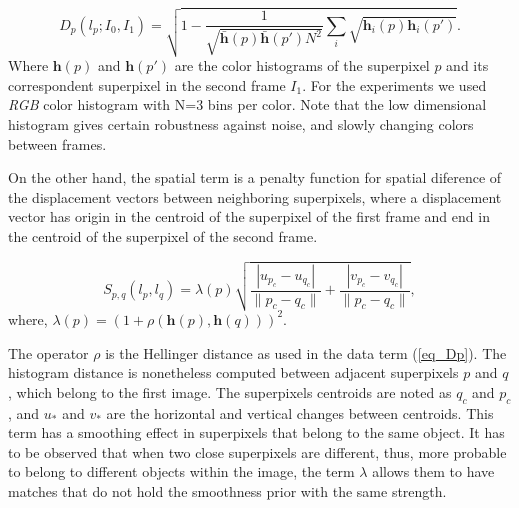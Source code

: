 \begin{equation}
D_p(l_p;I_0,I_1) = \sqrt{ 1 - \frac{1}{\sqrt{\bar{ \boldsymbol{h} }(p) \bar{ \boldsymbol{h} }(p')N^2} } \sum_{i}\sqrt{ \boldsymbol{h}_{i}(p) \boldsymbol{h}_{i}(p')} }.
\label{eq_Dp}
\end{equation}
Where $\textbf{h}(p)$ and $\textbf{h}(p')$ are the color histograms of the superpixel $p$ and its correspondent superpixel in the
second frame $I_1$. For the experiments we used {\it RGB} color histogram with N=3 bins per color.
Note that the low dimensional histogram gives certain robustness against noise,
and slowly changing colors between frames. 

On the other hand, the spatial term is a penalty function for spatial diference of the displacement vectors between neighboring superpixels, where a displacement vector has origin 
in the centroid of the superpixel of the first frame and
end in the centroid of the superpixel of the second frame.

\begin{equation}
S_{p,q}(l_p, l_q) = \lambda(p)
  \sqrt{\frac{|u_{p_c}-u_{q_c}|}{\|p_c-q_c\|}+ \frac{|v_{p_c}-v_{q_c}|}{\|p_c-q_c\|}},
\label{eq_Spq}
\end{equation}
 where, $ \lambda(p) = (1 + \rho(\boldsymbol{h}(p),\boldsymbol{h}(q)))^2 $.

The operator $\rho$ is the Hellinger distance as used in the
data term (\ref{eq_Dp}). The histogram distance is nonetheless computed between adjacent superpixels $p$ and $q$, 
which belong to the first image. The superpixels centroids are noted as $q_c$ and $p_c$, 
and $u_{*}$ and $v_{*}$ are the horizontal and vertical changes between centroids.
This term has a smoothing effect in superpixels that belong to the
same object. It has to be observed that when two close superpixels are different, thus, more probable to
belong to different objects within the image, the term $\lambda$ allows them to have
matches that do not hold the smoothness prior with the same strength. 


